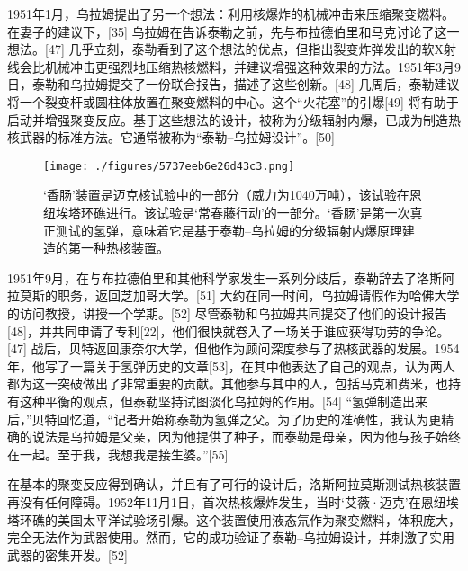 1951年1月，乌拉姆提出了另一个想法：利用核爆炸的机械冲击来压缩聚变燃料。在妻子的建议下，[35] 乌拉姆在告诉泰勒之前，先与布拉德伯里和马克讨论了这一想法。[47] 几乎立刻，泰勒看到了这个想法的优点，但指出裂变炸弹发出的软X射线会比机械冲击更强烈地压缩热核燃料，并建议增强这种效果的方法。1951年3月9日，泰勒和乌拉姆提交了一份联合报告，描述了这些创新。[48] 几周后，泰勒建议将一个裂变杆或圆柱体放置在聚变燃料的中心。这个“火花塞”的引爆[49] 将有助于启动并增强聚变反应。基于这些想法的设计，被称为分级辐射内爆，已成为制造热核武器的标准方法。它通常被称为“泰勒–乌拉姆设计”。[50]
\begin{figure}[ht]
\centering
\texttt{[image: ./figures/5737eeb6e26d43c3.png]}
\caption{‘香肠’装置是迈克核试验中的一部分（威力为1040万吨），该试验在恩纽埃塔环礁进行。该试验是‘常春藤行动’的一部分。‘香肠’是第一次真正测试的氢弹，意味着它是基于泰勒–乌拉姆的分级辐射内爆原理建造的第一种热核装置。} \label{fig_Ulam_6}
\end{figure}
1951年9月，在与布拉德伯里和其他科学家发生一系列分歧后，泰勒辞去了洛斯阿拉莫斯的职务，返回芝加哥大学。[51] 大约在同一时间，乌拉姆请假作为哈佛大学的访问教授，讲授一个学期。[52] 尽管泰勒和乌拉姆共同提交了他们的设计报告[48]，并共同申请了专利[22]，他们很快就卷入了一场关于谁应获得功劳的争论。[47] 战后，贝特返回康奈尔大学，但他作为顾问深度参与了热核武器的发展。1954年，他写了一篇关于氢弹历史的文章[53]，在其中他表达了自己的观点，认为两人都为这一突破做出了非常重要的贡献。其他参与其中的人，包括马克和费米，也持有这种平衡的观点，但泰勒坚持试图淡化乌拉姆的作用。[54] “氢弹制造出来后，”贝特回忆道，“记者开始称泰勒为氢弹之父。为了历史的准确性，我认为更精确的说法是乌拉姆是父亲，因为他提供了种子，而泰勒是母亲，因为他与孩子始终在一起。至于我，我想我是接生婆。”[55]

在基本的聚变反应得到确认，并且有了可行的设计后，洛斯阿拉莫斯测试热核装置再没有任何障碍。1952年11月1日，首次热核爆炸发生，当时‘艾薇·迈克’在恩纽埃塔环礁的美国太平洋试验场引爆。这个装置使用液态氘作为聚变燃料，体积庞大，完全无法作为武器使用。然而，它的成功验证了泰勒–乌拉姆设计，并刺激了实用武器的密集开发。[52]

